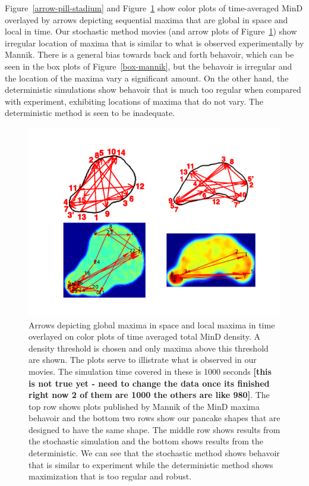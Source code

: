 \documentclass[letterpaper,twocolumn,amsmath,amssymb,pre]{revtex4-1}
\newcommand{\red}[1]{{\bf \color{red} #1}}
\newcommand{\fixme}[1]{\red{[#1]}}
\begin{document}
Figure~\ref{arrow-pill-stadium} and Figure~\ref{randst-plot-ave} show
color plots of time-averaged MinD overlayed by arrows depicting
sequential maxima that are global in space and local in time.  Our
stochastic method movies (and arrow plots of
Figure~\ref{randst-plot-ave}) show irregular location of maxima that
is similar to what is observed experimentally by Mannik. There is a
general bias towards back and forth behavoir, which can be seen in the
box plots of Figure~\ref{box-mannik}, but the behavoir is irregular
and the location of the maxima vary a significant amount.  On the
other hand, the deterministic simulations show behavoir that is much
too regular when compared with experiment, exhibiting locations of
maxima that do not vary.  The deterministic method is seen to be
inadequate.

\begin{figure}
  \centering
  \includegraphics[width=\columnwidth]{../paper/plot-ave}
  \caption{Arrows depicting global maxima in space and local maxima in
    time overlayed on color plots of time averaged total MinD density.
    A density threshold is chosen and only maxima above this threshold
    are shown. The plots serve to illistrate what is observed in our
    movies.  The simulation time covered in these is 1000 seconds
    \fixme{this is not true yet - need to change the data once its
      finished right now 2 of them are 1000 the others are like 980}.
    The top row shows plots published by Mannik of the MinD maxima
    behavoir and the bottom two rows show our pancake shapes that are
    designed to have the same shape.  The middle row shows results
    from the stochastic simulation and the bottom shows results from
    the deterministic.  We can see that the stochastic method shows
    behavoir that is similar to experiment while the deterministic
    method shows maximization that is too regular and robust.}
  \label{randst-plot-ave}
\end{figure}
\end{document}
